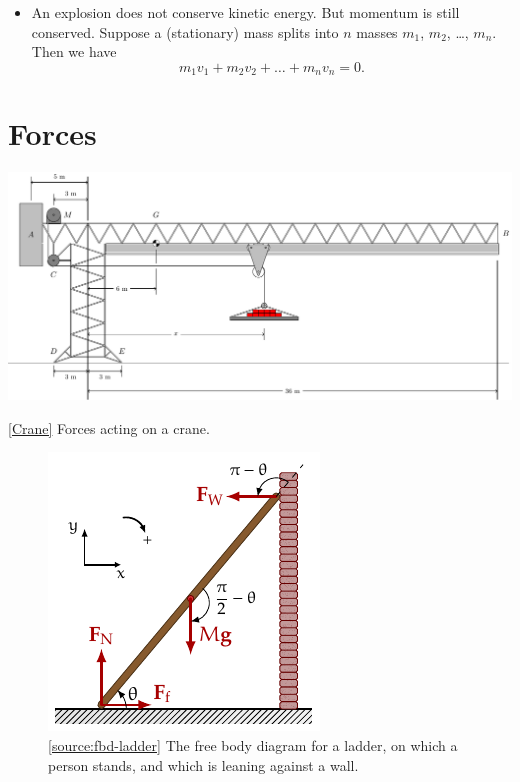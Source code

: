 \documentclass[oneside]{book}
\begin{document}
\begin{itemize}
    \item An explosion does not conserve kinetic energy. But momentum is still conserved. Suppose a (stationary) mass splits into \(n\) masses \(m_1\), \(m_2\), \dots, \(m_n\). Then we have
    \[m_1v_1+m_2v_2+\dots+m_nv_n=0.\]
\end{itemize}
\chapter{Forces}
\begin{center}
    \includegraphics[width=\textwidth,page=1]{../images/Crane/Crane.pdf}
    \captionsetup{type=figure}
    \caption[figure]{\ref{Crane} Forces acting on a crane.}
\end{center}
\begin{figure}[H]
    \centering
    \includegraphics[page=2]{../images/ladder/ladder.pdf}
    \caption{\ref{source:fbd-ladder} The free body diagram for a ladder, on which a person stands, and which is leaning against a wall.}
    \label{fig:fbd-ladder}
\end{figure}
\end{document}
